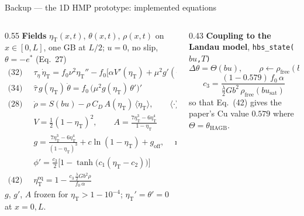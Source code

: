 \documentclass[10pt,aspectratio=169]{beamer}
\begin{document}
\begin{frame}{Backup --- the 1D HMP prototype: implemented equations}
  \scriptsize
  \begin{columns}[T]
    \begin{column}{0.55\textwidth}
      \textbf{Fields} $\eta_{\text{T}}(x,t)$, $\theta(x,t)$, $\rho(x,t)$ on $x\in[0,L]$, one GB at $L/2$;
      $u=0$, no slip, $\theta=-e^*$ (Eq.~27)
      \begin{align*}
        \text{(32)}\;\; & \tau_\eta\,\dot\eta_{\text{T}} = f_0\nu^2\eta_{\text{T}}''
          - f_0\big[\alpha V'(\eta_{\text{T}}) + \mu^2 g'(\eta_{\text{T}})\,\theta'^2\big]
          - \phi'(\eta_{\text{T}})\,\tfrac{\lambda}{2}Gb^2\rho \\
        \text{(34)}\;\; & \hat\tau\, g(\eta_{\text{T}})\,\dot\theta
          = f_0\,\big(\mu^2 g(\eta_{\text{T}})\,\theta'\big)' \\
        \text{(28)}\;\; & \dot\rho = S(bu) - \rho\, C_D\, A(\eta_{\text{T}})\,\langle\dot\eta_{\text{T}}\rangle,
          \qquad \langle\cdot\rangle = \max(\cdot,0)
      \end{align*}
      \vspace{-1.2em}
      \begin{align*}
        & V = \tfrac12(1-\eta_{\text{T}})^2,\qquad
          A = \frac{7\eta_{\text{T}}^3-6\eta_{\text{T}}^4}{1-\eta_{\text{T}}} \\
        & g = \frac{7\eta_{\text{T}}^3-6\eta_{\text{T}}^4}{(1-\eta_{\text{T}})^3}
            + c\ln(1-\eta_{\text{T}}) + g_{\text{off}},\quad \min g = 0.01 \\
        & \phi' = \tfrac{c_3}{2}\big[1-\tanh\big(c_1(\eta_{\text{T}}-c_2)\big)\big] \\
        \text{(42)}\;\; & \eta_{\text{T}}^{\text{eq}} = 1 - \frac{c_3\,\tfrac{\lambda}{2}Gb^2\rho}{f_0\,\alpha}
      \end{align*}
      $g$, $g'$, $A$ frozen for $\eta_{\text{T}} > 1-10^{-4}$; $\eta_{\text{T}}'=\theta'=0$ at $x=0,L$.
    \end{column}
    \begin{column}{0.43\textwidth}
      \textbf{Coupling to the Landau model}, \texttt{hbs\_state($bu$,$T$)}
      \[
        \Delta\theta = \Theta(bu),\qquad \rho \leftarrow \rho_{\text{free}}(bu),\qquad G = G(T,\dots)
      \]
      \[
        c_3 = \frac{(1-0.579)\,f_0\,\alpha}{\tfrac{\lambda}{2}Gb^2\,\rho_{\text{free}}(bu_{\text{sat}})}
      \]
      so that Eq.~(42) gives the paper's Cu value $0.579$ where $\Theta=\theta_{\text{HAGB}}$.


\end{column}
\end{columns}
\end{frame}
\end{document}
